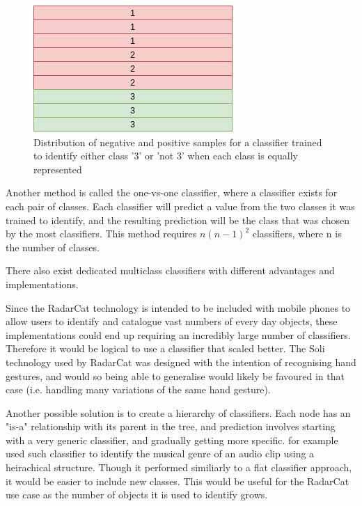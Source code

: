 \documentclass[12pt]{article}
\begin{document}
\begin{figure}[!ht]
	\centering
	\includegraphics[width=0.5\linewidth]{images/classifierperclass}
	\caption{Distribution of negative and positive samples for a classifier trained to identify either class '3' or 'not 3' when each class is equally represented}
	\label{fig:classifierperclass}
\end{figure}

Another method is called the one-vs-one classifier, where a classifier exists for each pair of classes. Each classifier will predict a value from the two classes it was trained to identify, and the resulting prediction will be the class that was chosen by the most classifiers. This method requires $n (n - 1)^2$ classifiers, where n is the number of classes.

There also exist dedicated multiclass classifiers with different advantages and implementations.

Since the RadarCat \cite{radarcat} technology is intended to be included with mobile phones to allow users to identify and catalogue vast numbers of every day objects, these implementations could end up requiring an incredibly large number of classifiers. Therefore it would be logical to use a classifier that scaled better. The Soli \cite{soli} technology used by RadarCat was designed with the intention of recognising hand gestures, and would so being able to generalise would likely be favoured in that case (i.e. handling many variations of the same hand gesture).

Another possible solution is to create a hierarchy of classifiers. Each node has an "is-a" relationship with its parent in the tree, and prediction involves starting with a very generic classifier, and gradually getting more specific. \cite{heirarchy} for example used such classifier to identify the musical genre of an audio clip using a heirachical structure. Though it performed similiarly to a flat classifier approach, it would be easier to include new classes. This would be useful for the RadarCat use case as the number of objects it is used to identify grows.
\end{document}
